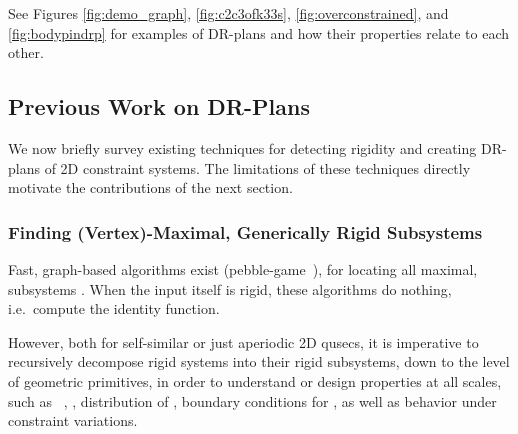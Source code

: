 See Figures \ref{fig:demo_graph}, \ref{fig:c2c3ofk33s}, \ref{fig:overconstrained}, and \ref{fig:bodypindrp} for examples of DR-plans and how their properties relate to each other.


\subsection{Previous Work on DR-Plans}
\label{sec:prev}
We now briefly survey existing techniques for detecting rigidity and creating DR-plans of 2D constraint systems. The limitations of these techniques directly motivate the contributions of the next  section.

\subsubsection{Finding (Vertex)-Maximal, Generically Rigid Subsystems}
Fast, graph-based algorithms exist (pebble-game~\cite{Jacobs:1997:PG,hoffmann1997solvablesubsets,jermann2006decomposition,Lee:2007:PGA}), for locating all maximal,  subsystems \seedefs. When the input itself is rigid, these algorithms do nothing, i.e.\ compute the identity function.

However, both for self-similar or just aperiodic 2D qusecs, it is imperative to recursively decompose rigid systems into their rigid subsystems, down to the level of geometric primitives, in order to understand or design properties at all scales, such as \seedefs\ , , distribution of , boundary conditions for , as well as behavior under constraint variations.

